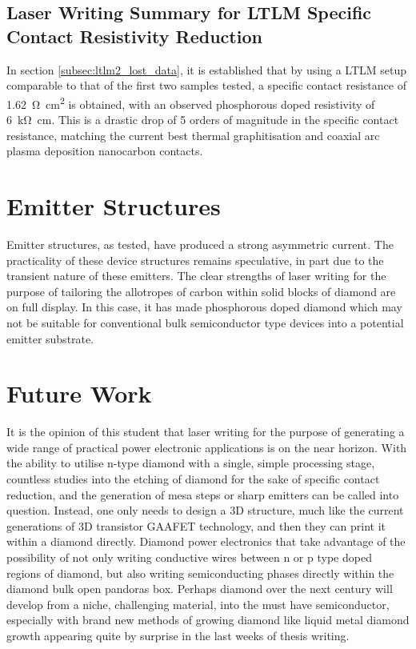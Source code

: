 \begin{refsection}
\subsection{Laser Writing Summary for LTLM Specific Contact Resistivity Reduction}
In section \ref{subsec:ltlm2_lost_data}, it is established that by using a LTLM setup comparable to that of the first two samples tested, a specific contact resistance of 1.62~\si{\ohm\centi\metre\squared} is obtained, with an observed phosphorous doped resistivity of 6~\si{\kilo\ohm\centi\metre}. This is a drastic drop of 5 orders of magnitude in the specific contact resistance, matching the current best thermal graphitisation and coaxial arc plasma deposition nanocarbon contacts.

\section{Emitter Structures}
Emitter structures, as tested, have produced a strong asymmetric current. The practicality of these device structures remains speculative, in part due to the transient nature of these emitters. The clear strengths of laser writing for the purpose of tailoring the allotropes of carbon within solid blocks of diamond are on full display. In this case, it has made phosphorous doped diamond which may not be suitable for conventional bulk semiconductor type devices into a potential emitter substrate. 

\section{Future Work}
It is the opinion of this student that laser writing for the purpose of generating a wide range of practical power electronic applications is on the near horizon. With the ability to utilise n-type diamond with a single, simple processing stage, countless studies into the etching of diamond for the sake of specific contact reduction, and the generation of mesa steps or sharp emitters can be called into question. Instead, one only needs to design a 3D structure, much like the current generations of 3D transistor GAAFET technology, and then they can print it within a diamond directly. Diamond power electronics that take advantage of the possibility of not only writing conductive wires between n or p type doped regions of diamond, but also writing semiconducting phases directly within the diamond bulk open pandoras box. Perhaps diamond over the next century will develop from a niche, challenging material, into the must have semiconductor, especially with brand new methods of growing diamond like liquid metal diamond growth appearing quite by surprise in the last weeks of thesis writing.

\printbibliography[heading=subbibliography]

\end{refsection}